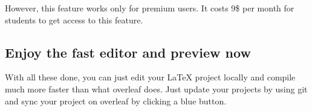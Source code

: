However, this feature works only for premium users. It costs 9\$ per month for students to get access to this feature.

\subsection*{Enjoy the fast editor and preview now}

With all these done, you can just edit your LaTeX project locally and compile much more faster than what overleaf does. Just update your projects by using git and sync your project on overleaf by clicking a blue button.

